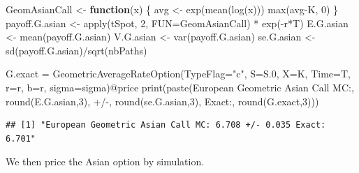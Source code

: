 \documentclass[12pt,]{tufte-book}
\newenvironment{Shaded}{}{}
\newcommand{\AttributeTok}[1]{\textcolor[rgb]{0.49,0.56,0.16}{#1}}
\newcommand{\ControlFlowTok}[1]{\textcolor[rgb]{0.00,0.44,0.13}{\textbf{#1}}}
\newcommand{\DecValTok}[1]{\textcolor[rgb]{0.25,0.63,0.44}{#1}}
\newcommand{\FloatTok}[1]{\textcolor[rgb]{0.25,0.63,0.44}{#1}}
\newcommand{\FunctionTok}[1]{\textcolor[rgb]{0.02,0.16,0.49}{#1}}
\newcommand{\NormalTok}[1]{#1}
\newcommand{\OtherTok}[1]{\textcolor[rgb]{0.00,0.44,0.13}{#1}}
\newcommand{\SpecialCharTok}[1]{\textcolor[rgb]{0.25,0.44,0.63}{#1}}
\newcommand{\StringTok}[1]{\textcolor[rgb]{0.25,0.44,0.63}{#1}}
\begin{document}
\begin{Shaded}
\begin{Highlighting}[]
\NormalTok{GeomAsianCall }\OtherTok{\textless{}{-}} \ControlFlowTok{function}\NormalTok{(x) \{}
\NormalTok{  avg }\OtherTok{\textless{}{-}} \FunctionTok{exp}\NormalTok{(}\FunctionTok{mean}\NormalTok{(}\FunctionTok{log}\NormalTok{(x)))}
  \FunctionTok{max}\NormalTok{(avg}\SpecialCharTok{{-}}\NormalTok{K, }\DecValTok{0}\NormalTok{)}
\NormalTok{\}}
\NormalTok{payoff.G.asian }\OtherTok{\textless{}{-}} \FunctionTok{apply}\NormalTok{(tSpot, }\DecValTok{2}\NormalTok{, }\AttributeTok{FUN=}\NormalTok{GeomAsianCall) }\SpecialCharTok{*} \FunctionTok{exp}\NormalTok{(}\SpecialCharTok{{-}}\NormalTok{r}\SpecialCharTok{*}\NormalTok{T)}
\NormalTok{E.G.asian }\OtherTok{\textless{}{-}} \FunctionTok{mean}\NormalTok{(payoff.G.asian)}
\NormalTok{V.G.asian }\OtherTok{\textless{}{-}} \FunctionTok{var}\NormalTok{(payoff.G.asian)}
\NormalTok{se.G.asian }\OtherTok{\textless{}{-}} \FunctionTok{sd}\NormalTok{(payoff.G.asian)}\SpecialCharTok{/}\FunctionTok{sqrt}\NormalTok{(nbPaths)}

\NormalTok{G.exact }\OtherTok{=} \FunctionTok{GeometricAverageRateOption}\NormalTok{(}\AttributeTok{TypeFlag=}\StringTok{"c"}\NormalTok{, }\AttributeTok{S=}\NormalTok{S}\FloatTok{.0}\NormalTok{, }\AttributeTok{X=}\NormalTok{K, }\AttributeTok{Time=}\NormalTok{T,}
                                     \AttributeTok{r=}\NormalTok{r, }\AttributeTok{b=}\NormalTok{r, }\AttributeTok{sigma=}\NormalTok{sigma)}\SpecialCharTok{@}\NormalTok{price}
\FunctionTok{print}\NormalTok{(}\FunctionTok{paste}\NormalTok{(}\StringTok{\textquotesingle{}European Geometric Asian Call MC:\textquotesingle{}}\NormalTok{, }\FunctionTok{round}\NormalTok{(E.G.asian,}\DecValTok{3}\NormalTok{),}
            \StringTok{\textquotesingle{}+/{-}\textquotesingle{}}\NormalTok{, }\FunctionTok{round}\NormalTok{(se.G.asian,}\DecValTok{3}\NormalTok{), }\StringTok{\textquotesingle{}Exact:\textquotesingle{}}\NormalTok{, }\FunctionTok{round}\NormalTok{(G.exact,}\DecValTok{3}\NormalTok{)))}
\end{Highlighting}
\end{Shaded}

\begin{verbatim}
## [1] "European Geometric Asian Call MC: 6.708 +/- 0.035 Exact: 6.701"
\end{verbatim}

We then price the Asian option by simulation.
\end{document}
